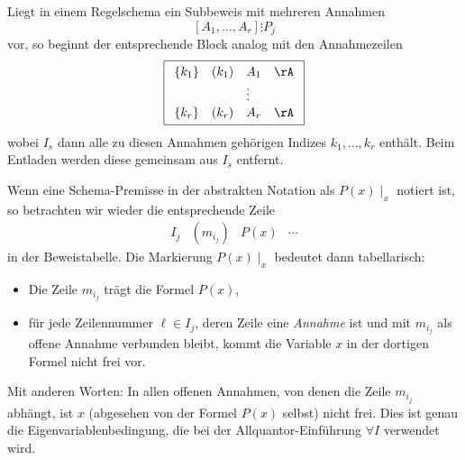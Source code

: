 \documentclass[main.tex]{subfiles}
\begin{document}
\medskip

Liegt in einem Regelschema ein Subbeweis mit mehreren Annahmen
\[
  [A_1,\dots,A_r]\vdots P_j
\]
vor, so beginnt der entsprechende Block analog mit den Annahmezeilen
\[
\boxed{%
  \begin{array}{llll}
    \{k_1\} & (k_1) & A_1 & \rA \\[0.2ex]
           &       &\vdots&     \\[0.2ex]
    \{k_r\} & (k_r) & A_r & \rA
  \end{array}
}
\]
wobei \(I_s\) dann alle zu diesen Annahmen gehörigen Indizes
\(k_1,\dots,k_r\) enthält. Beim Entladen werden diese gemeinsam aus
\(I_s\) entfernt.

\medskip

Wenn eine Schema-Premisse in der abstrakten Notation als
\(P(x)\mid_x\) notiert ist, so betrachten wir wieder die
entsprechende Zeile
\[
  \begin{array}{llll}
    I_j & (m_{i_j}) & P(x) & \cdots
  \end{array}
\]
in der Beweistabelle. Die Markierung \(P(x)\mid_x\) bedeutet dann
tabellarisch:
\begin{itemize}
  \item Die Zeile \(m_{i_j}\) trägt die Formel \(P(x)\),
  \item für jede Zeilennummer \(\ell \in I_j\), deren Zeile eine
        \emph{Annahme} ist und mit \(m_{i_j}\) als offene Annahme
        verbunden bleibt, kommt die Variable \(x\) in der dortigen
        Formel nicht frei vor.
\end{itemize}
Mit anderen Worten: In allen offenen Annahmen, von denen die Zeile
\(m_{i_j}\) abhängt, ist \(x\) (abgesehen von der Formel \(P(x)\)
selbst) nicht frei. Dies ist genau die Eigenvariablenbedingung, die
bei der Allquantor-Einführung \(\forall I\) verwendet wird.

\medskip
\end{document}
